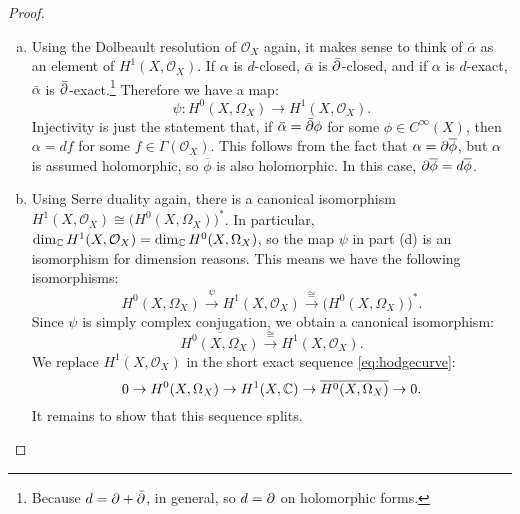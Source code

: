 \documentclass{article}
\begin{document}
\begin{proof}
\begin{enumerate}[(a)]
\item Using the Dolbeault resolution of $\mathcal{O}_X$ again, it makes sense to think of $\bar \alpha$ as an
element of $H^1(X, \mathcal{O}_X)$. If $\alpha$ is $d$-closed, $\bar \alpha$ is $\bar {\partial}$-closed, and if
$\alpha$ is $d$-exact, $\bar \alpha$ is $\bar {\partial}$-exact.\footnote{Because $d = \partial + \bar {\partial}$, in general,
so $d=\partial$ on holomorphic forms.} Therefore we have a map:
\[	\psi: H^0(X,\Omega_X) \to H^1(X, \mathcal{O}_X).	\]
Injectivity is just the statement that, if $\bar \alpha = \bar {\partial} \phi$ for some $\phi \in C^{\infty}(X)$, then
$\alpha = d f$ for some $f \in \Gamma(\mathcal{O}_X)$. This follows from the fact that $\alpha = \partial \overline{\phi}$,
but $\alpha$ is assumed holomorphic, so $\overline{\phi}$ is also holomorphic. In this case, $\partial \overline{\phi}
= d \overline{\phi}$.

\item Using Serre duality again, there is a canonical isomorphism $H^1(X, \mathcal{O}_X) \cong 
\big(H^0(X, \Omega_X)  \big)^*$. In particular, $\dim_{\mathbb{C}} H^1(X, \mathcal{O}_X) = \dim_{\mathbb{C}} H^0(X, \Omega_X)$,
so the map $\psi$ in part (d) is an isomorphism for dimension reasons. This means we have the following
isomorphisms:
\[	H^0(X,\Omega_X) \overset{\psi}{\to} H^1(X, \mathcal{O}_X) \overset{\cong}{\to} \big(H^0(X, \Omega_X)  \big)^*.	\]
Since $\psi$ is simply complex conjugation, we obtain a canonical isomorphism:
\[	\overline{H^0(X,\Omega_X)} \overset{\cong}{\to} H^1(X, \mathcal{O}_X).	\]
We replace $H^1(X, \mathcal{O}_X)$ in the short exact sequence \ref{eq:hodgecurve}:
\[	0 \to H^0(X, \Omega_X) \to H^1(X, \mathbb{C}) \to \overline{H^0(X,\Omega_X)} \to 0.	\]
It remains to show that this sequence splits.


\end{enumerate}
\end{proof}
\end{document}
